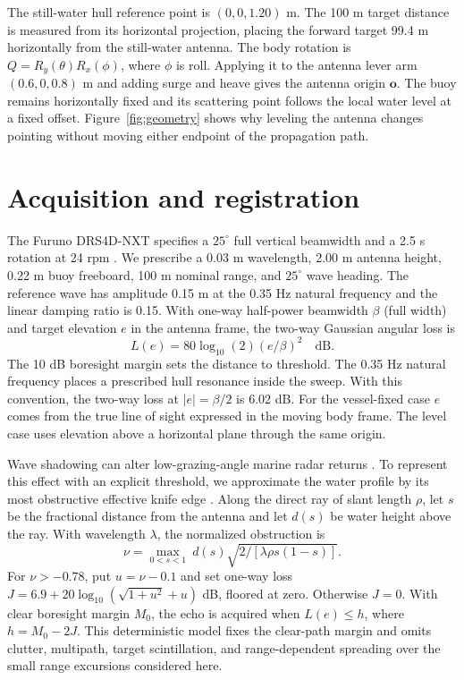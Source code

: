 \documentclass[nofoot]{asmeconf}
\begin{document}
The still-water hull reference point is $(0,0,1.20)$ m. The 100 m target distance is measured from its horizontal projection, placing the forward target 99.4 m horizontally from the still-water antenna. The body rotation is $Q=R_y(\theta)R_x(\phi)$, where $\phi$ is roll. Applying it to the antenna lever arm $(0.6,0,0.8)$ m and adding surge and heave gives the antenna origin $\mathbf{o}$. The buoy remains horizontally fixed and its scattering point follows the local water level at a fixed offset. Figure~\ref{fig:geometry} shows why leveling the antenna changes pointing without moving either endpoint of the propagation path.



\section{Acquisition and registration}
The Furuno DRS4D-NXT specifies a $25^\circ$ full vertical beamwidth and a 2.5 s rotation at 24 rpm \cite{Furuno2016DRS4DNXT}. We prescribe a 0.03 m wavelength, 2.00 m antenna height, 0.22 m buoy freeboard, 100 m nominal range, and $25^\circ$ wave heading. The reference wave has amplitude 0.15 m at the 0.35 Hz natural frequency and the linear damping ratio is 0.15. With one-way half-power beamwidth $\beta$ (full width) and target elevation $e$ in the antenna frame, the two-way Gaussian angular loss is
\begin{equation}
 L(e)=80\log_{10}(2)(e/\beta)^2\quad \text{dB}.
\end{equation}
The 10 dB boresight margin sets the distance to threshold. The 0.35 Hz natural frequency places a prescribed hull resonance inside the sweep. With this convention, the two-way loss at $|e|=\beta/2$ is 6.02 dB. For the vessel-fixed case $e$ comes from the true line of sight expressed in the moving body frame. The level case uses elevation above a horizontal plane through the same origin.



Wave shadowing can alter low-grazing-angle marine radar returns \cite{Plant2012WaveShadowing}. To represent this effect with an explicit threshold, we approximate the water profile by its most obstructive effective knife edge \cite{ITUR2025P526}. Along the direct ray of slant length $\rho$, let $s$ be the fractional distance from the antenna and let $d(s)$ be water height above the ray. With wavelength $\lambda$, the normalized obstruction is
\begin{equation}
 \nu=\max_{0<s<1}\ d(s)\sqrt{2/[\lambda\rho s(1-s)]}.
\end{equation}
For $\nu>-0.78$, put $u=\nu-0.1$ and set one-way loss $J=6.9+20\log_{10}(\sqrt{1+u^2}+u)$ dB, floored at zero. Otherwise $J=0$. With clear boresight margin $M_0$, the echo is acquired when $L(e)\le h$, where $h=M_0-2J$. This deterministic model fixes the clear-path margin and omits clutter, multipath, target scintillation, and range-dependent spreading over the small range excursions considered here.
\end{document}
